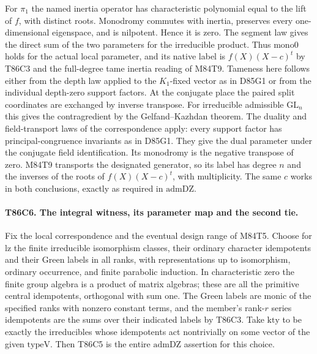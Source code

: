 For $\pi_1$ the named inertia operator has characteristic
polynomial equal to the lift of $f$, with distinct roots.
Monodromy commutes with inertia, preserves every one-dimensional
eigenspace, and is nilpotent. Hence it is zero. The segment law
gives the direct sum of the two parameters for the irreducible
product. Thus $\mathrm{mono0}$ holds for the actual local
parameter, and its native label is $f(X)(X-c)^t$ by T86C3 and
the full-degree tame inertia reading of M84T9. Tameness here
follows either from the depth law applied to the $K_1$-fixed vector
as in D85G1 or from the individual depth-zero support factors.
At the conjugate place the paired split coordinates are exchanged
by inverse transpose. For irreducible admissible
$\mathrm{GL}_n$ this gives the contragredient by the
Gelfand--Kazhdan theorem. The duality and field-transport laws
of the correspondence apply: every support factor has
principal-congruence invariants as in D85G1. They give the dual
parameter under the conjugate field identification. Its monodromy
is the negative transpose of zero. M84T9 transports the designated
generator, so its label has degree $n$ and the inverses of the
roots of $f(X)(X-c)^t$, with multiplicity. The same $c$ works
in both conclusions, exactly as required in $\mathrm{admDZ}$.

\paragraph{T86C6. The integral witness, its parameter map and the second tie.}
Fix the local correspondence and the eventual design range of
M84T5. Choose for $\mathrm{lz}$ the finite irreducible
isomorphism classes, their ordinary character idempotents and
their Green labels in all ranks, with representations up to
isomorphism, ordinary occurrence, and finite parabolic induction.
In characteristic zero the finite group algebra is a product of
matrix algebras; these are all the primitive central idempotents,
orthogonal with sum one. The Green labels are monic of the
specified ranks with nonzero constant terms, and the member's
rank-$r$ series idempotents are the sums over their indicated
labels by T86C3. Take $\mathrm{kty}$ to be exactly the
irreducibles whose idempotents act nontrivially on some vector of
the given $\mathrm{typeV}$. Then T86C5 is the entire
$\mathrm{admDZ}$ assertion for this choice.

